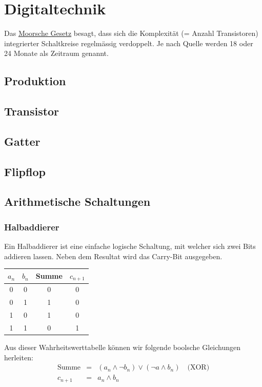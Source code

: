 \documentclass{report}
\begin{document}
\chapter{Digitaltechnik}
Das \underline{Moorsche Gesetz} besagt, dass sich die Komplexität (= Anzahl Transistoren) integrierter Schaltkreise regelmässig verdoppelt. Je nach Quelle werden 18 oder 24 Monate als Zeitraum genannt.
\section{Produktion}
\section{Transistor}
\section{Gatter}
\section{Flipflop}
\section{Arithmetische Schaltungen}
\subsection{Halbaddierer}
Ein Halbaddierer ist eine einfache logische Schaltung, mit welcher sich zwei Bits addieren lassen. Neben dem Resultat wird das Carry-Bit ausgegeben.
\begin{center}\begin{tabular}{c c | c c}
$a_n$ & $b_n$ & Summe & $c_{n+1}$ \\ \hline
0 & 0 & 0 & 0 \\
0 & 1 & 1 & 0 \\
1 & 0 & 1 & 0 \\
1 & 1 & 0 & 1\end{tabular}\end{center}
Aus dieser Wahrheitswerttabelle können wir folgende boolsche Gleichungen herleiten:
\begin{eqnarray}
\mbox{Summe} & = & (a_n \land \lnot b_n) \lor (\lnot a \land b_n) \quad \mbox{(XOR)} \\
c_{n+1} & = & a_n \land b_n\end{eqnarray}
\end{document}
